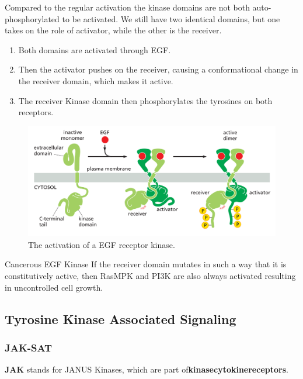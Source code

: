 \documentclass[../main.tex]{subfiles}
\begin{document}
Compared to the regular activation the kinase domains are not both auto-phosphorylated to be activated. We still have two identical domains, but one takes on the role of activator, while the other is the receiver.

\begin{enumerate}
	\item Both domains are activated through EGF.
	\item Then the activator pushes on the receiver, causing a conformational change in the receiver domain, which makes it active. 
	\item The receiver Kinase domain then phosphorylates the tyrosines on both receptors.
\end{enumerate}

\begin{figure}[H]
	\centering
	\includegraphics[width=0.7\linewidth]{egf_path}
	\caption{The activation of a EGF receptor kinase.}
	\label{fig:egfpath}
\end{figure}


\begin{RemarkWithTitel}{Cancerous EGF Kinase}
	If the receiver domain mutates in such a way that it is constitutively active, then \gls{RasMPK} and \gls{PI3K} are also always activated resulting in uncontrolled cell growth.
\end{RemarkWithTitel}


\subsection{Tyrosine Kinase Associated Signaling}
\subsubsection{JAK-SAT}

\textbf{\gls{JAK}} stands for JANUS Kinases, which are part of\textbf{\gls{kinasecytokinereceptors}}. 
\end{document}
